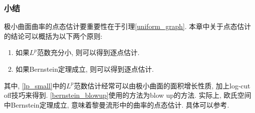 \subsubsection*{小结}
\noindent 极小曲面曲率的点态估计要重要性在于引理\eqref{uniform_graph}. 本章中关于点态估计的结论可以概括为以下两个原则:
\begin{enumerate}
    \item 如果$L^p$范数充分小, 则可以得到逐点估计. \label{lp_small}
    \item 如果Bernstein定理成立, 则可以得到逐点估计.\label{bernstein_blowup}
\end{enumerate}
其中, \eqref{lp_small}中的$L^p$范数估计经常可以由极小曲面的面积增长性质, 加上log-cut off技巧来得到. \eqref{bernstein_blowup}使用的方法为blow up的方法.  实际上, 欧氏空间中Bernstein定理成立, 意味着黎曼流形中的曲率的点态估计. 具体可以参考\cite[p.111 定理 19.3]{Perez}.
